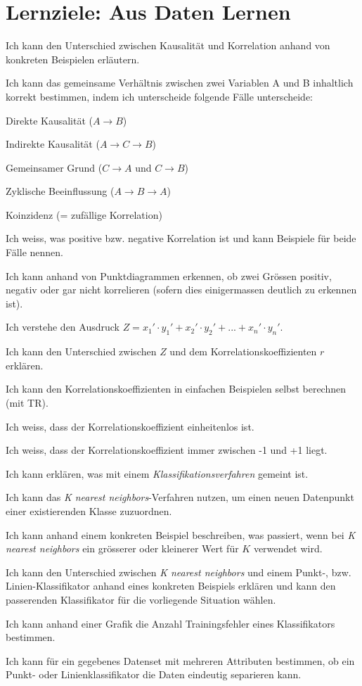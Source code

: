 \section*{Lernziele: Aus Daten Lernen}
\begin{todolist}
\item Ich kann den Unterschied zwischen Kausalität und Korrelation anhand von konkreten Beispielen erläutern.
\item Ich kann das gemeinsame Verhältnis zwischen zwei Variablen A und B inhaltlich korrekt bestimmen, indem ich unterscheide folgende Fälle unterscheide:
\begin{todolist}
\item Direkte Kausalität ($A\rightarrow B$)
\item Indirekte Kausalität ($A\rightarrow C\rightarrow B$)
\item Gemeinsamer Grund ($C\rightarrow A$ und $C\rightarrow B$)
\item Zyklische Beeinflussung ($A\rightarrow B \rightarrow A$)
\item Koinzidenz (= zufällige Korrelation)
\end{todolist}
\item Ich weiss, was positive bzw. negative Korrelation ist und kann Beispiele für beide Fälle nennen.
\item Ich kann anhand von Punktdiagrammen erkennen, ob zwei Grössen positiv,
negativ oder gar nicht korrelieren (sofern dies einigermassen deutlich zu
erkennen ist).
\item Ich verstehe den Ausdruck $Z=x_1'\cdot y_1'+x_2'\cdot y_2'+...+x_n'\cdot y_n'$.
\item Ich kann den Unterschied zwischen $Z$ und dem Korrelationskoeffizienten $r$ erklären.
\item Ich kann den Korrelationskoeffizienten in einfachen Beispielen selbst berechnen
(mit TR).
\item Ich weiss, dass der Korrelationskoeffizient einheitenlos ist.
\item Ich weiss, dass der Korrelationskoeffizient immer zwischen -1 und +1 liegt.
\item Ich kann erklären, was mit einem \textit{Klassifikationsverfahren} gemeint ist.
\item Ich kann das \textit{K nearest neighbors}-Verfahren nutzen, um einen neuen Datenpunkt einer existierenden Klasse zuzuordnen.
\item Ich kann anhand einem konkreten Beispiel beschreiben, was passiert, wenn bei \textit{K nearest neighbors} ein grösserer oder kleinerer Wert für $K$ verwendet wird.
\item Ich kann den Unterschied zwischen \textit{K nearest neighbors} und einem Punkt-, bzw. Linien-Klassifikator anhand eines konkreten Beispiels erklären und kann den passerenden Klassifikator für die vorliegende Situation wählen.
\item Ich kann anhand einer Grafik die Anzahl Trainingsfehler eines Klassifikators bestimmen.
\item Ich kann für ein gegebenes Datenset mit mehreren Attributen bestimmen, ob ein Punkt- oder Linienklassifikator die Daten eindeutig separieren kann.
\end{todolist}